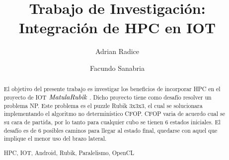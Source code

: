 \documentclass[runningheads,a4paper]{llncs}
\newcommand{\keywords}[1]{\par\addvspace\baselineskip
\noindent\keywordname\enspace\ignorespaces#1}
\newcommand{\MR}{$\emph{MatulaRubik}$ }
\begin{document}
\mainmatter  %

\title{Trabajo de Investigación:\\
Integración de HPC en IOT}


%
%
\author{Adrian Radice%
\and Facundo Sanabria}
%


%
%

\maketitle


\begin{abstract}
El objetivo del presente trabajo es investigar los beneficios de incorporar HPC en el proyecto de IOT
\MR. Dicho proyecto tiene como desafío resolver un problema NP. Este problema es el puzzle Rubik 3x3x3, el cual
se solucionara implementando el algoritmo no determinístico CFOP. CFOP varia de acuerdo cual 
se su cara de partida, por lo tanto para cualquier cubo se tienen 6 estados iniciales. El desafío es de 6 posibles caminos para 
llegar al estado final, quedarse con aquel que implique el menor uso del brazo lateral.
\keywords{HPC, IOT, Android, Rubik, Paralelismo, OpenCL}
\end{abstract}
\end{document}
